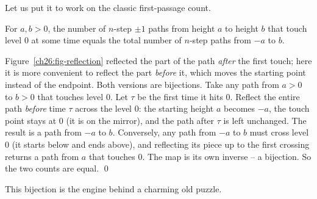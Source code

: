 Let us put it to work on the classic first-passage count.

\begin{theorem}
\label{ch26:thm-reflection}
For $a, b > 0$, the number of $n$-step $\pm 1$ paths from height $a$ to height
$b$ that touch level $0$ at some time equals the total number of $n$-step paths
from $-a$ to $b$.
\end{theorem}

\begin{whybox}
Figure~\ref{ch26:fig-reflection} reflected the part of the path \emph{after} the first
touch; here it is more convenient to reflect the part \emph{before} it, which moves the
starting point instead of the endpoint. Both versions are bijections.
Take any path from $a > 0$ to $b > 0$ that touches level $0$. Let $\tau$ be the
first time it hits $0$. Reflect the entire path \emph{before} time $\tau$ across
the level $0$: the starting height $a$ becomes $-a$, the touch point stays at
$0$ (it is on the mirror), and the path after $\tau$ is left unchanged. The
result is a path from $-a$ to $b$. Conversely, any path from $-a$ to $b$ must
cross level $0$ (it starts below and ends above), and reflecting its piece up
to the first crossing returns a path from $a$ that touches $0$. The map is its
own inverse -- a bijection. So the two counts are equal. \qed
\end{whybox}

This bijection is the engine behind a charming old puzzle.

